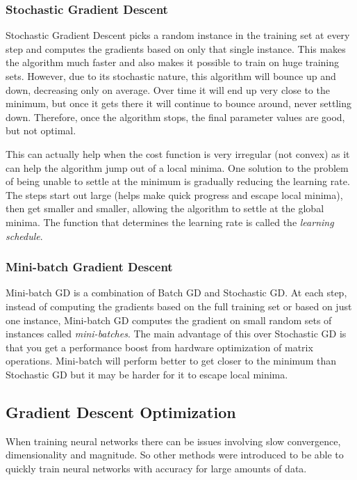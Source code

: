 \documentclass[12pt]{article}
\begin{document}
        \subsubsection{Stochastic Gradient Descent}
            Stochastic Gradient Descent picks a random instance in the training set at every step and computes the
            gradients based on only that single instance. This makes the algorithm much faster and also makes it
            possible to train on huge training sets. However, due to its stochastic nature, this algorithm will bounce
            up and down, decreasing only on average. Over time it will end up very close to the minimum, but once it
            gets there it will continue to bounce around, never settling down. Therefore, once the algorithm stops, the
            final parameter values are good, but not optimal.

            This can actually help when the cost function is very irregular (not convex) as it can help the algorithm
            jump out of a local minima. One solution to the problem of being unable to settle at the minimum is
            gradually reducing the learning rate. The steps start out large (helps make quick progress and escape local
            minima), then get smaller and smaller, allowing the algorithm to settle at the global minima. The function
            that determines the learning rate is called the \textit{learning schedule}.
        
        \subsubsection{Mini-batch Gradient Descent}
            Mini-batch GD is a combination of Batch GD and Stochastic GD. At each step, instead of computing the
            gradients based on the full training set or based on just one instance, Mini-batch GD computes the gradient
            on small random sets of instances called \textit{mini-batches}. The main advantage of this over Stochastic
            GD is that you get a performance boost from hardware optimization of matrix operations. Mini-batch will
            perform better to get closer to the minimum than Stochastic GD but it may be harder for it to escape local
            minima.
    
    \subsection{Gradient Descent Optimization} \label{sec:GDO}
        When training neural networks there can be issues involving slow convergence, dimensionality and magnitude. So
        other methods were introduced to be able to quickly train neural networks with accuracy for large amounts of
        data.
        
\end{document}
